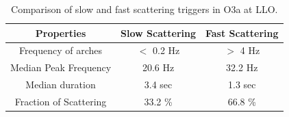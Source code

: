 \documentclass[12pt]{iopart}
\begin{document}
\begin{table}[h]
    \centering
    \begin{tabular}{c|c|c}
    \hline
      \textbf{Properties}   &  \textbf{Slow Scattering} & 
      \textbf{Fast Scattering}\\
      \hline
       Frequency of arches  & $<$ 0.2 Hz & $>$ 4 Hz \\
      \hline
      Median Peak Frequency & 20.6 Hz & 32.2 Hz \\
      \hline
      Median duration & 3.4 sec & 1.3 sec \\
      \hline
      Fraction of Scattering & 33.2 \% & 66.8 \% \\
       
    \hline
    \end{tabular}
    \caption{Comparison of slow and fast scattering triggers in O3a at LLO.}
    \label{tab:fastslowtab}
\end{table}{}
\end{document}

